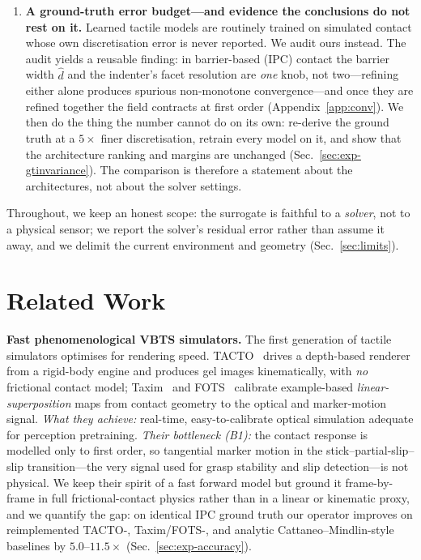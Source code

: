 \documentclass[conference]{IEEEtran}
\begin{document}
\begin{enumerate}
\emph{image} by gradient descent (Sec.~\ref{sec:exp-sensor}).
\item \textbf{A ground-truth error budget---and evidence the conclusions do not
rest on it.} Learned tactile models are routinely trained on simulated contact
whose own discretisation error is never reported. We audit ours instead. The audit
yields a reusable finding: in barrier-based (IPC) contact the barrier width
$\hat d$ and the indenter's facet resolution are \emph{one} knob, not two---refining
either alone produces spurious non-monotone convergence---and once they are refined
together the field contracts at first order (Appendix~\ref{app:conv}). We then do
the thing the number cannot do on its own: re-derive the ground truth at a
$5\times$ finer discretisation, retrain every model on it, and show that the
architecture ranking and margins are unchanged (Sec.~\ref{sec:exp-gtinvariance}).
The comparison is therefore a statement about the architectures, not about the
solver settings.
\end{enumerate}
Throughout, we keep an honest scope: the surrogate is faithful to a \emph{solver},
not to a physical sensor; we report the solver's residual error rather than assume
it away, and we delimit the current environment and geometry
(Sec.~\ref{sec:limits}).

\section{Related Work}\label{sec:related}

\textbf{Fast phenomenological VBTS simulators.}
The first generation of tactile simulators optimises for rendering speed.
TACTO~\cite{wang2022tacto} drives a depth-based renderer from a rigid-body engine
and produces gel images kinematically, with \emph{no} frictional contact model;
Taxim~\cite{si2022taxim} and FOTS~\cite{zhao2023fots} calibrate example-based
\emph{linear-superposition} maps from contact geometry to the optical and
marker-motion signal. \emph{What they achieve:} real-time, easy-to-calibrate
optical simulation adequate for perception pretraining. \emph{Their bottleneck (B1):}
the contact response is modelled only to first order, so tangential marker motion
in the stick--partial-slip--slip transition---the very signal used for grasp
stability and slip detection---is not physical. We keep their spirit of a fast
forward model but ground it frame-by-frame in full frictional-contact physics rather
than in a linear or kinematic proxy, and we quantify the gap: on identical IPC
ground truth our operator improves on reimplemented TACTO-, Taxim/FOTS-, and
analytic Cattaneo--Mindlin-style baselines by $5.0$--$11.5\times$
(Sec.~\ref{sec:exp-accuracy}).
\end{document}
